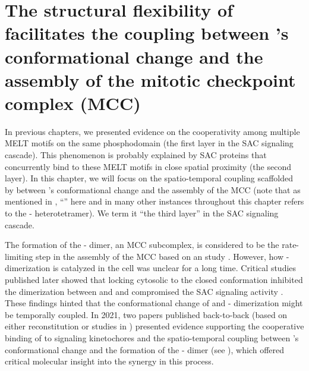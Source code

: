 \chapter{The structural flexibility of  facilitates the coupling between 's conformational change and the assembly of the mitotic checkpoint complex (MCC)}
\label{chpt:4}

In previous chapters, we presented evidence on the cooperativity among multiple MELT motifs on the same  phosphodomain (the first layer in the SAC signaling cascade). This phenomenon is probably explained by SAC proteins that concurrently bind to these MELT motifs in close spatial proximity (the second layer). In this chapter, we will focus on the spatio-temporal coupling scaffolded by  between 's conformational change and the assembly of the MCC \cite{BUB1-CDC20-MAD1,Tripartite} (note that as mentioned in , ``'' here and in many other instances throughout this chapter refers to the - heterotetramer). We term it ``the third layer'' in the SAC signaling cascade. %

The formation of the - dimer, an MCC subcomplex, is considered to be the rate-limiting step in the assembly of the MCC based on an  study \cite{Faesen2017}. However, how - dimerization is catalyzed in the cell was unclear for a long time. Critical studies published later showed that locking cytosolic  to the closed conformation inhibited the dimerization between  and  and compromised the SAC signaling activity \cite{Ma+Poon2016,Ma+Poon2018,Kim2018}. These findings hinted that the conformational change of  and - dimerization might be temporally coupled. In 2021, two papers published back-to-back (based on either  reconstitution \cite{BUB1-CDC20-MAD1} or studies in  \cite{Tripartite}) presented evidence supporting the cooperative binding of  to signaling kinetochores and the spatio-temporal coupling between 's conformational change and the formation of the - dimer (see ), which offered critical molecular insight into the synergy in this process.

